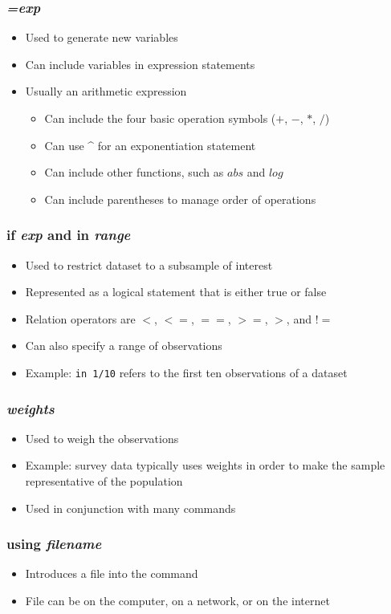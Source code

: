 \documentclass{beamer}
\begin{document}
\begin{frame}
	\frametitle{\textit{=exp}}
		\begin{itemize}
			\item Used to generate new variables
			\item Can include variables in expression statements
			\item Usually an arithmetic expression
				\begin{itemize}
					\item Can include the four basic operation symbols ($+$, $-$, $*$, $/$)
					\item Can use \^{} for an exponentiation statement
					\item Can include other functions, such as $abs$ and $log$
					\item Can include parentheses to manage order of operations
				\end{itemize}
		\end{itemize}
\end{frame}

\begin{frame}
	\frametitle{if \textit{exp} and in \textit{range}}
		\begin{itemize}
			\item Used to restrict dataset to a subsample of interest
			\item Represented as a logical statement that is either true or false
			\item Relation operators are $<$, $<=$, $==$, $>=$, $>$, and $!=$
			\item Can also specify a range of observations
			\item Example: \texttt{in 1/10} refers to the first ten observations of a dataset
		\end{itemize}
\end{frame}

\begin{frame}
	\frametitle{\textit{weights}}
		\begin{itemize}
			\item Used to weigh the observations
			\item Example: survey data typically uses weights in order to make the sample representative of the population
			\item Used in conjunction with many commands
		\end{itemize}
\end{frame}

\begin{frame}
	\frametitle{using \textit{filename}}
		\begin{itemize}
			\item Introduces a file into the command
			\item File can be on the computer, on a network, or on the internet
		\end{itemize}
\end{frame}
\end{document}
